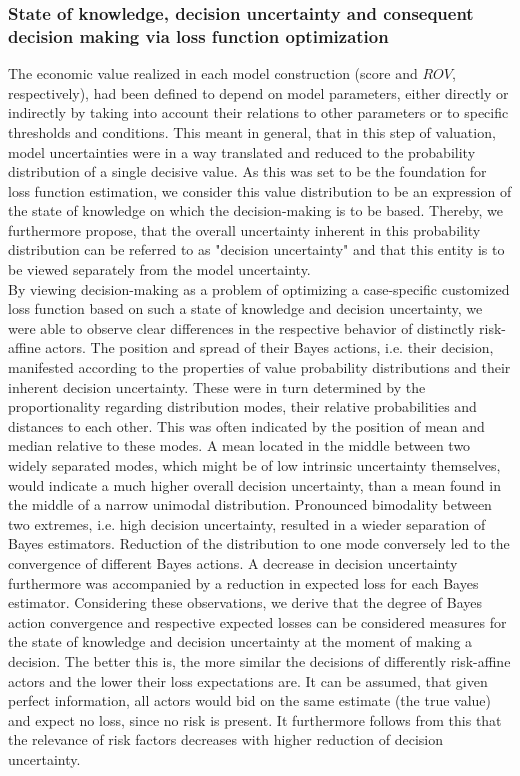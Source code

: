 	\subsubsection{State of knowledge, decision uncertainty and consequent decision making via loss function optimization}
	The economic value realized in each model construction (score and $ROV$, respectively), had been defined to depend on model parameters, either directly or indirectly by taking into account their relations to other parameters or to specific thresholds and conditions. This meant in general, that in this step of valuation, model uncertainties were in a way translated and reduced to the probability distribution of a single decisive value. As this was set to be the foundation for loss function estimation, we consider this value distribution to be an expression of the state of knowledge on which the decision-making is to be based. Thereby, we furthermore propose, that the overall uncertainty inherent in this probability distribution can be referred to as "decision uncertainty" and that this entity is to be viewed separately from the model uncertainty.\\	
	By viewing decision-making as a problem of optimizing a case-specific customized loss function based on such a state of knowledge and decision uncertainty, we were able to observe clear differences in the respective behavior of distinctly risk-affine actors.
	The position and spread of their Bayes actions, i.e. their decision, manifested according to the properties of value probability distributions and their inherent decision uncertainty. These were in turn determined by the proportionality regarding distribution modes, their relative probabilities and distances to each other. This was often indicated by the position of mean and median relative to these modes. A mean located in the middle between two widely separated modes, which might be of low intrinsic uncertainty themselves, would indicate a much higher overall decision uncertainty, than a mean found in the middle of a narrow unimodal distribution. Pronounced bimodality between two extremes, i.e. high decision uncertainty, resulted in a wieder separation of Bayes estimators. Reduction of the distribution to one mode conversely led to the convergence of different Bayes actions. A decrease in decision uncertainty furthermore was accompanied by a reduction in expected loss for each Bayes estimator. 
	Considering these observations, we derive that the degree of Bayes action convergence and respective expected losses can be considered measures for the state of knowledge and decision uncertainty at the moment of making a decision. The better this is, the more similar the decisions of differently risk-affine actors and the lower their loss expectations are. It can be assumed, that given perfect information, all actors would bid on the same estimate (the true value) and expect no loss, since no risk is present. It furthermore follows from this that the relevance of risk factors decreases with higher reduction of decision uncertainty.
